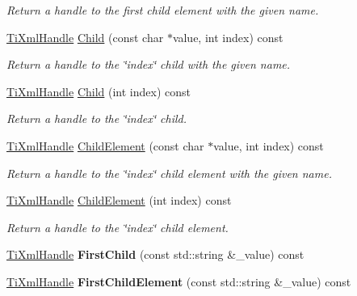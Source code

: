 \begin{DoxyCompactItemize}
\begin{DoxyCompactList}\small\item\em Return a handle to the first child element with the given name. \end{DoxyCompactList}\item 
\hyperlink{class_ti_xml_handle}{Ti\+Xml\+Handle} \hyperlink{class_ti_xml_handle_a072492b4be1acdb0db2d03cd8f71ccc4}{Child} (const char $\ast$value, int index) const 
\begin{DoxyCompactList}\small\item\em Return a handle to the \char`\"{}index\char`\"{} child with the given name. \end{DoxyCompactList}\item 
\hyperlink{class_ti_xml_handle}{Ti\+Xml\+Handle} \hyperlink{class_ti_xml_handle_af9cf6a7d08a5da94a8924425ad0cd5ac}{Child} (int index) const 
\begin{DoxyCompactList}\small\item\em Return a handle to the \char`\"{}index\char`\"{} child. \end{DoxyCompactList}\item 
\hyperlink{class_ti_xml_handle}{Ti\+Xml\+Handle} \hyperlink{class_ti_xml_handle_a979a3f850984a176ee884e394c7eed2d}{Child\+Element} (const char $\ast$value, int index) const 
\begin{DoxyCompactList}\small\item\em Return a handle to the \char`\"{}index\char`\"{} child element with the given name. \end{DoxyCompactList}\item 
\hyperlink{class_ti_xml_handle}{Ti\+Xml\+Handle} \hyperlink{class_ti_xml_handle_a8786475b9d1f1518492e3a46704c7ef0}{Child\+Element} (int index) const 
\begin{DoxyCompactList}\small\item\em Return a handle to the \char`\"{}index\char`\"{} child element. \end{DoxyCompactList}\item 
\hyperlink{class_ti_xml_handle}{Ti\+Xml\+Handle} {\bfseries First\+Child} (const std\+::string \&\+\_\+value) const \hypertarget{class_ti_xml_handle_a8b10982dd39e74f3b068ca8952282d8a}{}\label{class_ti_xml_handle_a8b10982dd39e74f3b068ca8952282d8a}

\item 
\hyperlink{class_ti_xml_handle}{Ti\+Xml\+Handle} {\bfseries First\+Child\+Element} (const std\+::string \&\+\_\+value) const \hypertarget{class_ti_xml_handle_a743f1e9cc18b5658c158ed5c0c165354}{}\label{class_ti_xml_handle_a743f1e9cc18b5658c158ed5c0c165354}


\end{DoxyCompactItemize}
